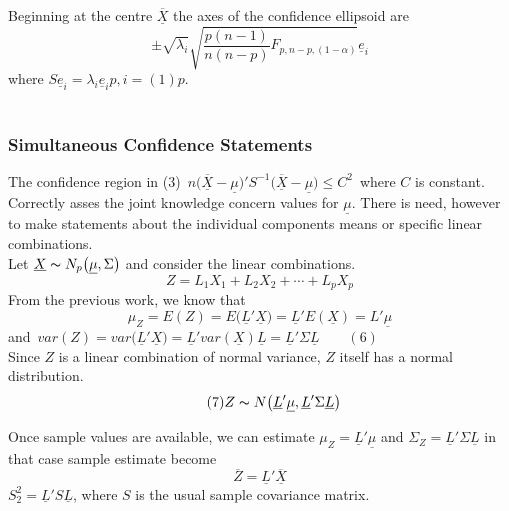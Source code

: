 \documentclass[11pt,a4paper]{article}
\theoremstyle{definition}
\begin{document}
Beginning at the centre $\overline{\underline{X}}$ the axes of the confidence ellipsoid are $$\pm \sqrt{\lambda_i}\sqrt{\frac{p(n-1)}{n(n-p)}F_{p,n-p,(1-\alpha)}}\underline{e}_i$$ where $S\underline{e}_i = \lambda_i\underline{e}_ip,  i= (1)p$.\\\\



\subsubsection*{Simultaneous Confidence Statements}
The confidence region in (3) 
\,$\displaystyle{ n\big(\overline{\underline{X}}-\underline{\mu}\big)'S^{-1}\big(\overline{\underline{X}}-\underline{\mu}\big) \leq C^2}\,$ where $C$ is constant. Correctly asses the joint knowledge concern values for $\underline{\mu}$. There is need, however to make statements about the individual components means or specific linear combinations.\\

Let $\underline{X}\thicksim N_p\big(\underline{\mu},\Sigma\big)$ and consider the linear combinations. \begin{equation}\tag{4}
Z = L_1X_1 + L_2X_2 + \cdots+ L_pX_p
\end{equation}
From the previous work, we know that \begin{equation}\tag{5}
\mu_Z =E(Z) = E\big(\underline{L}'\underline{X}\big) = \underline{L}'E(\underline{X})=L'\underline{\mu}
\end{equation} and $\, \displaystyle{var(Z) = var\big(\underline{L}'\underline{X}\big) = \underline{L}'var(\underline{X})\underline{L}=\underline{L}'\Sigma\underline{L}\qquad (6)}$\\

Since $Z$ is a linear combination of normal variance, $Z$ itself has a normal distribution. \begin{equation}\tag{7}
Z\thicksim N\big(\underline{L}'\underline{\mu}, \underline{L}'\Sigma\underline{L}\big)
\end{equation} 

Once sample values are available, we can estimate $\mu_Z= \underline{L}'\underline{\mu}$ and $\Sigma_Z = \underline{L}'\Sigma \underline{L}$ in that case sample estimate become \begin{equation}\tag{8}
\overline{Z} = \underline{L}'\overline{\underline{X}}
\end{equation}
$S^2_2 = \displaystyle{\underline{L}'S\underline{L}}$, where $S$ is the usual sample covariance matrix.\\
\end{document}
